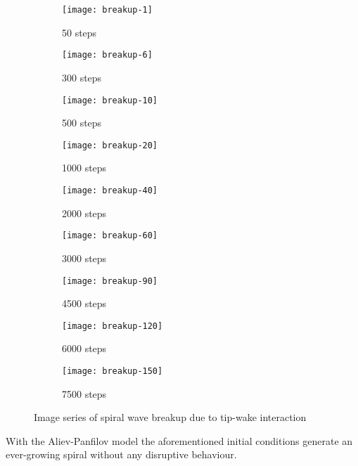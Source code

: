 \begin{figure}[h]
    \centering
    \begin{subfigure}[b]{.3\textwidth}
        \texttt{[image: breakup-1]}
        \vspace{-\baselineskip}
        \caption{50 steps}
    \end{subfigure}
    \begin{subfigure}[b]{.3\textwidth}
        \texttt{[image: breakup-6]}
        \vspace{-\baselineskip}
        \caption{300 steps}
    \end{subfigure}
    \begin{subfigure}[b]{.3\textwidth}
        \texttt{[image: breakup-10]}
        \vspace{-\baselineskip}
        \caption{500 steps}
    \end{subfigure}
    \begin{subfigure}[b]{.3\textwidth}
        \texttt{[image: breakup-20]}
        \vspace{-\baselineskip}
        \caption{1000 steps}
    \end{subfigure}
    \begin{subfigure}[b]{.3\textwidth}
        \texttt{[image: breakup-40]}
        \vspace{-\baselineskip}
        \caption{2000 steps}
    \end{subfigure}
    \begin{subfigure}[b]{.3\textwidth}
        \texttt{[image: breakup-60]}
        \vspace{-\baselineskip}
        \caption{3000 steps}
    \end{subfigure}
    \begin{subfigure}[b]{.3\textwidth}
        \texttt{[image: breakup-90]}
        \vspace{-\baselineskip}
        \caption{4500 steps}
    \end{subfigure}
    \begin{subfigure}[b]{.3\textwidth}
        \texttt{[image: breakup-120]}
        \vspace{-\baselineskip}
        \caption{6000 steps}
    \end{subfigure}
    \begin{subfigure}[b]{.3\textwidth}
        \texttt{[image: breakup-150]}
        \vspace{-\baselineskip}
        \caption{7500 steps}
    \end{subfigure}
    \caption{Image series of spiral wave breakup due to tip-wake interaction}
    \label{fig:breakup}
\end{figure}

With the Aliev-Panfilov model the aforementioned initial conditions generate
an ever-growing spiral without any disruptive behaviour.


